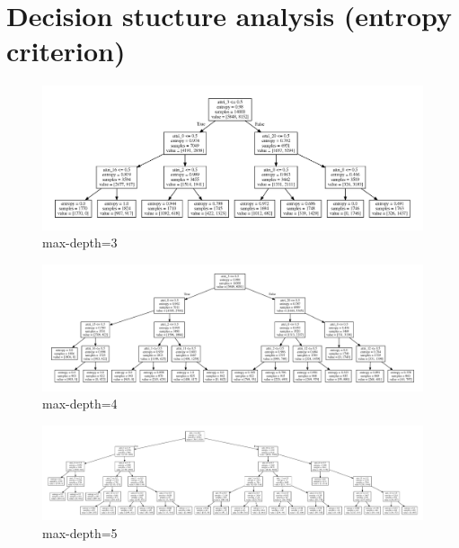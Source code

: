 \documentclass[8pt,a4paper]{article}
\begin{document}
\section*{Decision stucture analysis (entropy criterion)} 
\label{sec:Decision stucture analysis (entropy criterion)}

\begin{figure}[H]
    \begin{center}
        \includegraphics[width=550pt]{decision_tree_depth_m2_3.png}
        \caption{max-depth=3}
        
    \end{center}
\end{figure}


\begin{figure}[H]
    \begin{center}
        \includegraphics[width=550pt]{decision_tree_depth_m2_4.png}
        \caption{max-depth=4}
        
    \end{center}
\end{figure}


\begin{figure}[H]
    \begin{center}
        \includegraphics[width=550pt]{decision_tree_depth_m2_5.png}
        \caption{max-depth=5}
        
    \end{center}
\end{figure}
\end{document}
